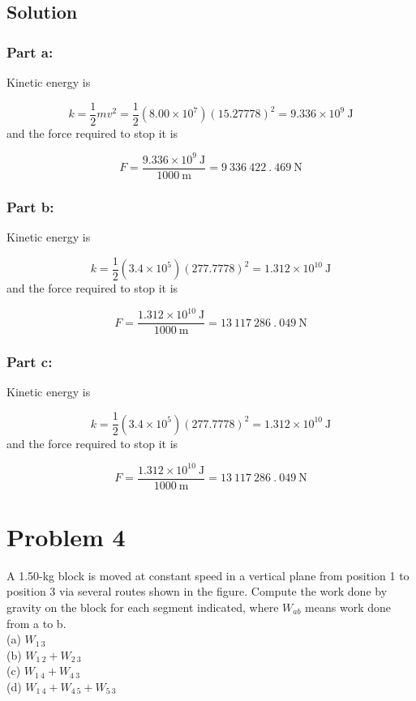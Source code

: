 \documentclass{article}
\begin{document}
\subsection*{Solution}
\subsubsection*{Part a:}
Kinetic energy is

\[
	k = \frac{1}{2} mv^2 = \frac{1}{2}(8.00 \times 10^7)(15.27778)^2 = \boxed{9.336\times10^{9}\ \text{J}}
\]
and the force required to stop it is

\[
	F = \frac{9.336\times10^{9}\ \text{J}}{1000\ \text{m}} = \boxed{9\ 336\ 422\ .\ 469\ \text{N}}
\]

\subsubsection*{Part b:}
Kinetic energy is

\[
	k = \frac{1}{2}(3.4 \times 10^5)(277.7778)^2 = \boxed{1.312\times10^{10}\ \text{J}}
\]
and the force required to stop it is

\[
	F = \frac{1.312\times10^{10}\ \text{J}}{1000\ \text{m}} = \boxed{13\ 117\ 286\ .\ 049\ \text{N}}
\]

\subsubsection*{Part c:}
Kinetic energy is

\[
	k = \frac{1}{2}(3.4 \times 10^5)(277.7778)^2 = \boxed{1.312\times10^{10}\ \text{J}}
\]
and the force required to stop it is

\[
	F = \frac{1.312\times10^{10}\ \text{J}}{1000\ \text{m}} = \boxed{13\ 117\ 286\ .\ 049\ \text{N}}
\]

\section*{Problem 4}
A 1.50-kg block is moved at constant speed in a vertical plane from position 1 to position 3 via several
routes shown in the figure. Compute the work done by gravity on the block for each segment indicated,
where $W_{ab}$ means work done from a to b. \\
(a) $W_{1\ 3}$ \\
(b) $W_{1\ 2} + W_{2\ 3}$ \\
(c) $W_{1\ 4} + W_{4\ 3}$ \\
(d) $W_{1\ 4} + W_{4\ 5} + W_{5\ 3}$
\end{document}
